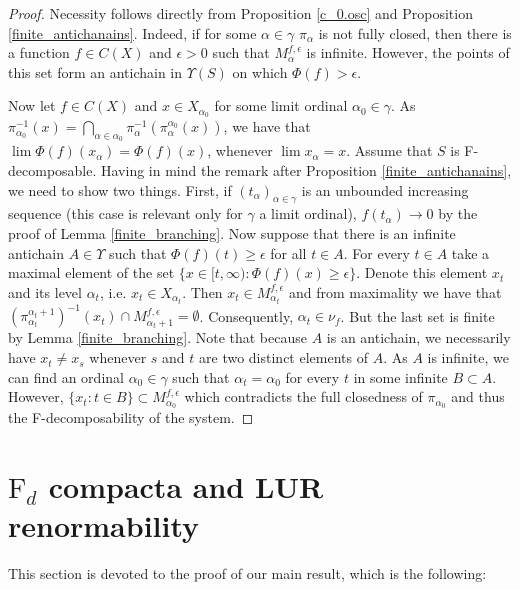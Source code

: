 \documentclass[11pt]{article}
\theoremstyle{definition}
\theoremstyle{remark}
\begin{document}
\begin{proof}
	Necessity follows directly from Proposition \ref{c_0.osc} and Proposition \ref{finite_antichanains}. Indeed, if for some $\alpha \in \gamma$ $\pi_\alpha$ is not fully closed, then there is a function $f \in C(X)$ and $\epsilon >0$ such that $M^{f, \epsilon}_\alpha$ is infinite. However, the points of this set form an antichain in $\Upsilon(S)$ on which $\Phi(f) > \epsilon$.
	
	Now let $f \in C(X)$ and $x \in X_{\alpha_0}$ for some limit ordinal $\alpha_0 \in \gamma$. As $\pi_{\alpha_0}^{-1} (x) = \bigcap_{\alpha \in \alpha_0} \pi_\alpha^{-1}(\pi^{\alpha_0}_\alpha(x))$, we have that $\lim \Phi(f)(x_\alpha) = \Phi(f)(x)$, whenever $\lim x_\alpha = x$. Assume that $S$ is F-decomposable. Having in mind the remark after Proposition \ref{finite_antichanains}, we need to show two things. First, if $(t_\alpha)_{\alpha \in \gamma}$ is an unbounded increasing sequence (this case is relevant only for $\gamma$ a limit ordinal), $f(t_\alpha) \to 0$ by the proof of Lemma \ref{finite_branching}. Now suppose that there is an infinite antichain $A \in \Upsilon$ such that $\Phi(f)(t) \geq \epsilon$ for all $t \in A$. For every $t \in A$ take a maximal element of the set $\{x \in [t, \infty): \Phi(f)(x) \geq \epsilon\}$. Denote this element $x_t$ and its level $\alpha_t$, i.e. $x_t \in X_{\alpha_t}$. Then $x_t \in M^{f, \epsilon}_{\alpha_t}$ and from maximality we have that $(\pi^{\alpha_t+1}_{\alpha_t})^{-1}(x_t) \cap M^{f, \epsilon}_{\alpha_t + 1} = \emptyset$. Consequently, $\alpha_t \in \nu_f$. But the last set is finite by Lemma \ref{finite_branching}. Note that because $A$ is an antichain, we necessarily have $x_t \neq x_s$ whenever $s$ and $t$ are two distinct elements of $A$. As $A$ is infinite, we can find an ordinal $\alpha_0 \in \gamma$ such that $\alpha_t = \alpha_0$ for every $t$ in some infinite $B \subset A$. However, $\{x_t: t \in B\} \subset M^{f, \epsilon}_{\alpha_0}$ which contradicts the full closedness of $\pi_{\alpha_0}$ and thus the F-decomposability of the system.
\end{proof}

\section{$\mathrm{F}_d$ compacta and LUR renormability} \label{sect_proof}

This section is devoted to the proof of our main result, which is the following:
\end{document}
